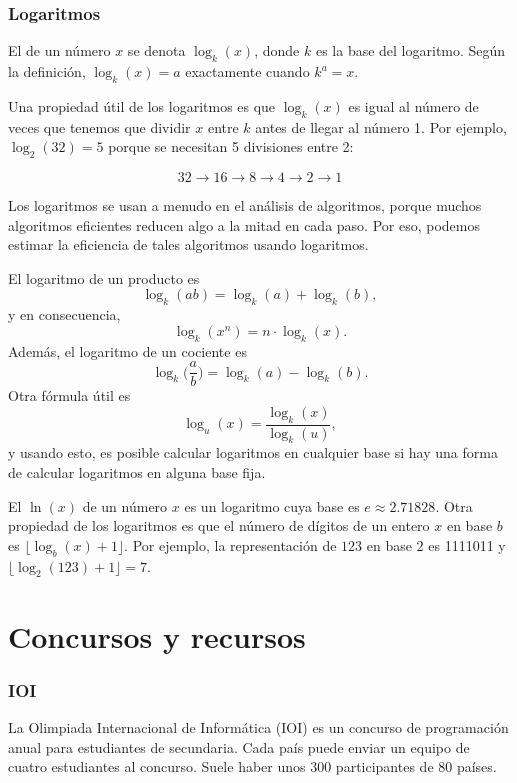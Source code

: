 \subsubsection{Logaritmos}


El  de un número $x$
se denota $\log_k(x)$, donde $k$ es la base
del logaritmo.
Según la definición,
$\log_k(x)=a$ exactamente cuando $k^a=x$.

Una propiedad útil de los logaritmos es
que $\log_k(x)$ es igual al número de veces
que tenemos que dividir $x$ entre $k$ antes de llegar
al número 1.
Por ejemplo, $\log_2(32)=5$
porque se necesitan 5 divisiones entre 2:

\[32 \rightarrow 16 \rightarrow 8 \rightarrow 4 \rightarrow 2 \rightarrow 1 \]

Los logaritmos se usan a menudo en el análisis de
algoritmos, porque muchos algoritmos eficientes
reducen algo a la mitad en cada paso.
Por eso, podemos estimar la eficiencia de tales algoritmos
usando logaritmos.

El logaritmo de un producto es
\[\log_k(ab) = \log_k(a)+\log_k(b),\]
y en consecuencia,
\[\log_k(x^n) = n \cdot \log_k(x).\]
Además, el logaritmo de un cociente es
\[\log_k\Big(\frac{a}{b}\Big) = \log_k(a)-\log_k(b).\]
Otra fórmula útil es
\[\log_u(x) = \frac{\log_k(x)}{\log_k(u)},\]
y usando esto, es posible calcular
logaritmos en cualquier base si hay una forma de
calcular logaritmos en alguna base fija.


El  $\ln(x)$ de un número $x$
es un logaritmo cuya base es $e \approx 2.71828$.
Otra propiedad de los logaritmos es que
el número de dígitos de un entero $x$ en base $b$ es
$\lfloor \log_b(x)+1 \rfloor$.
Por ejemplo, la representación de
$123$ en base $2$ es 1111011 y
$\lfloor \log_2(123)+1 \rfloor = 7$.

\section{Concursos y recursos}

\subsubsection{IOI}

La Olimpiada Internacional de Informática (IOI)
es un concurso de programación anual para
estudiantes de secundaria.
Cada país puede enviar un equipo de
cuatro estudiantes al concurso.
Suele haber unos 300 participantes
de 80 países.

